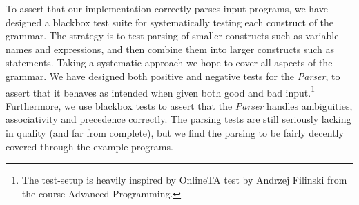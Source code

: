 To assert that our implementation correctly parses input programs, we have designed a blackbox test suite for systematically testing each construct of the grammar.
The strategy is to test parsing of smaller constructs such as variable names and expressions, and then combine them into larger constructs such as statements.
Taking a systematic approach we hope to cover all aspects of the grammar. We have designed both positive and negative tests for the \textit{Parser}, to assert that it behaves as intended when given both good and bad input.\footnote{The test-setup is heavily inspired by OnlineTA test by Andrzej Filinski from the course Advanced Programming.}
Furthermore, we use blackbox tests to assert that the \textit{Parser} handles ambiguities, associativity and precedence correctly.
The parsing tests are still seriously lacking in quality (and far from complete), but we find the parsing to be fairly decently covered through the example programs.
